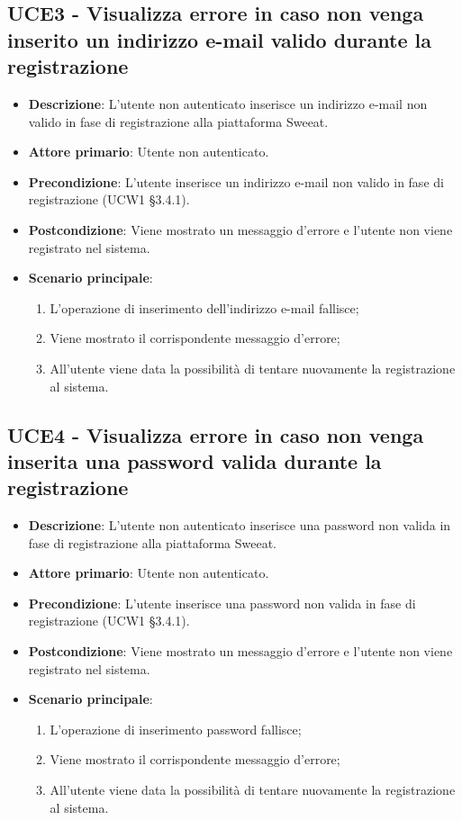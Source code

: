 \subsection{UCE3 - Visualizza errore in caso non venga inserito un indirizzo e-mail valido durante la registrazione}
\begin{itemize}
\item \textbf{Descrizione}: L'utente non autenticato inserisce un indirizzo e-mail non valido in fase di registrazione alla piattaforma Sweeat.
\item \textbf{Attore primario}: Utente non autenticato.
\item \textbf{Precondizione}: L'utente inserisce un indirizzo e-mail non valido in fase di registrazione (UCW1 §3.4.1).
\item \textbf{Postcondizione}: Viene mostrato un messaggio d'errore e l'utente non viene registrato nel sistema.

\item \textbf{Scenario principale}:
\begin{enumerate}
\item L'operazione di inserimento dell'indirizzo e-mail fallisce;
\item Viene mostrato il corrispondente messaggio d'errore;
\item All'utente viene data la possibilità di tentare nuovamente la registrazione al sistema.
\end{enumerate}
\end{itemize}

\subsection{UCE4 - Visualizza errore in caso non venga inserita una password valida durante la registrazione}
\begin{itemize}
\item \textbf{Descrizione}: L'utente non autenticato inserisce una password non valida in fase di registrazione alla piattaforma Sweeat.
\item \textbf{Attore primario}: Utente non autenticato.
\item \textbf{Precondizione}: L'utente inserisce una password non valida in fase di registrazione (UCW1 §3.4.1).
\item \textbf{Postcondizione}: Viene mostrato un messaggio d'errore e l'utente non viene registrato nel sistema.

\item \textbf{Scenario principale}:
\begin{enumerate}
\item L'operazione di inserimento password fallisce;
\item Viene mostrato il corrispondente messaggio d'errore;
\item All'utente viene data la possibilità di tentare nuovamente la registrazione al sistema.
\end{enumerate}
\end{itemize}